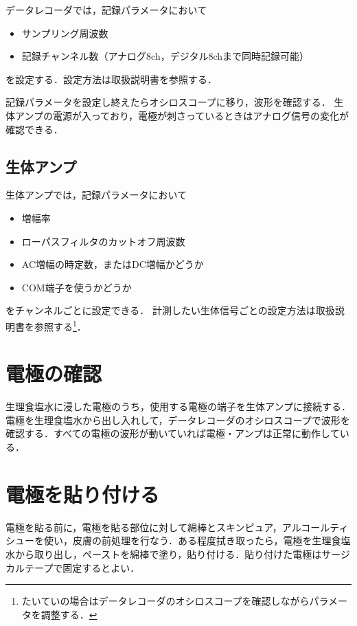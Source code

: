 \documentclass[a4j, twocolumn, openleft, uplatex, dvipdfmx]{jsbook}
\begin{document}
            データレコーダでは，記録パラメータにおいて
            \begin{itemize}
                \item サンプリング周波数
                \item 記録チャンネル数（アナログ8ch，デジタル8chまで同時記録可能）
            \end{itemize}
            を設定する．設定方法は取扱説明書を参照する．

            記録パラメータを設定し終えたらオシロスコープに移り，波形を確認する．
            生体アンプの電源が入っており，電極が刺さっているときはアナログ信号の変化が確認できる．

            \subsection{生体アンプ}
            \label{sub:生体アンプ}

            生体アンプでは，記録パラメータにおいて
            \begin{itemize}
                \item 増幅率
                \item ローパスフィルタのカットオフ周波数
                \item AC増幅の時定数，またはDC増幅かどうか
                \item COM端子を使うかどうか
            \end{itemize}
            をチャンネルごとに設定できる．
            計測したい生体信号ごとの設定方法は取扱説明書を参照する\footnote{たいていの場合はデータレコーダのオシロスコープを確認しながらパラメータを調整する．}．

        \section{電極の確認}
        \label{sec:電極の確認}

            生理食塩水に浸した電極のうち，使用する電極の端子を生体アンプに接続する．
            電極を生理食塩水から出し入れして，データレコーダのオシロスコープで波形を確認する．すべての電極の波形が動いていれば電極・アンプは正常に動作している．

        \section{電極を貼り付ける}
        \label{sec:電極を貼り付ける}

            電極を貼る前に，電極を貼る部位に対して綿棒とスキンピュア，アルコールティシューを使い，皮膚の前処理を行なう．ある程度拭き取ったら，電極を生理食塩水から取り出し，ペーストを綿棒で塗り，貼り付ける．貼り付けた電極はサージカルテープで固定するとよい．
\end{document}
